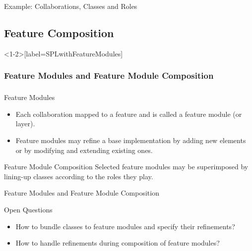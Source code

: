 \begin{frame}{Example: Collaborations, Classes and Roles}
	\begin{exampletight}{}
		\centering
	\end{exampletight}
\end{frame}

\subsection{Feature Composition}

\begin{frame}<1-2>[label=SPLwithFeatureModules]
	\frametitle<1-2>{Feature Modules and Feature Module Composition}
	\frametitle<3>{\myframetitle}
	\begin{fancycolumns}[widths={65,35}]
		\begin{definition}{Feature Modules}
			\begin{itemize}
				\item Each collaboration mapped to a feature and is called a feature module (or layer).
				\item Feature modules may refine a base implementation by adding new elements or by modifying and extending existing ones.
			\end{itemize}
		\end{definition}
	\nextcolumn
		\begin{definition}{Feature Module Composition}
			Selected feature modules may be superimposed by lining-up classes according to the roles they play.
		\end{definition}
	\end{fancycolumns}
	\begin{exampletight}{}
		\centering
	\end{exampletight}
\end{frame}

\begin{frame}{Feature Modules and Feature Module Composition}
	\begin{note}{Open Questions}
		\begin{itemize}
			\item How to bundle classes to feature modules and specify their refinements?
			\item How to handle refinements during composition of feature modules?
		\end{itemize}
	\end{note}
	\begin{exampletight}{}
		\centering
	\end{exampletight}
\end{frame}

